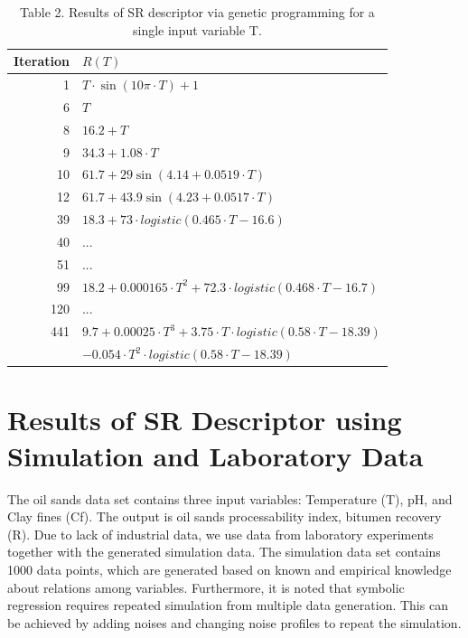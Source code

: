 \documentclass[final,5p,times,twocolumn]{elsarticle}
\begin{document}
\begin{table}[!hptb]\label{tab:iteration}
	\begin{center}
		\captionsetup{labelformat=empty}
		
		\caption{Table 2. Results of SR descriptor via genetic programming for a single input variable T.}
		
		\begin{tabular}{|r|l|}
			\hline
			Iteration & $R(T)$ \\
			\hline
			1 & $T \cdot \sin ( 10 \pi \cdot T ) + 1$ \\
			6 & $T$ \\
			8 & $16.2+T$ \\
			9 & $34.3+1.08 \cdot T$ \\
			10 & $61.7+29\sin(4.14+0.0519 \cdot T)$ \\
			12 & $61.7+43.9\sin(4.23+0.0517 \cdot T)$ \\
			39 & $18.3+73 \cdot logistic(0.465 \cdot T-16.6)$ \\
			40 & ... \\
			51 & ... \\
			99 & $18.2+0.000165 \cdot T^2 +72.3 \cdot logistic(0.468 \cdot T-16.7)$ \\
			120 & ... \\
			441 & $9.7 + 0.00025 \cdot T^3 + 3.75 \cdot T \cdot logistic(0.58 \cdot T - 18.39)$ \\ 
			& $- 0.054 \cdot T^2 \cdot logistic(0.58 \cdot T - 18.39)$ \\
			\hline
		\end{tabular}
		
	\end{center}
\end{table}

\section{Results of SR Descriptor using Simulation and Laboratory Data} \label{sec:related}

The oil sands data set contains three input variables: Temperature (T), pH, and Clay fines (Cf). The output is oil sands processability index, bitumen recovery (R). Due to lack of industrial data, we use data from laboratory experiments together with the generated simulation data. The simulation data set contains 1000 data points, which are generated based on known and empirical knowledge about relations among variables. Furthermore, it is noted that symbolic regression requires repeated simulation from multiple data generation. This can be achieved by adding noises and changing noise profiles to repeat the simulation.
\end{document}
